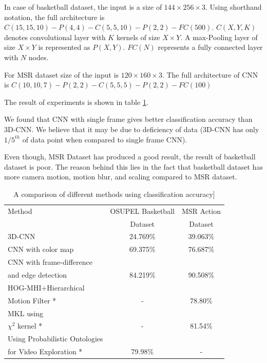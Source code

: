 In case of basketball dataset, the input is a size of $144 \times 256 \times 3$. Using shorthand notation, the full architecture is $C(15, 15, 10)-P(4, 4)-C(5, 5, 10)-P(2, 2)-FC(500)$. $C(X, Y, K)$ denotes convolutional layer with $K$ kernels of size $X \times Y$. A max-Pooling layer of size $X \times Y$ is represented as $P(X,Y)$. $FC(N)$ represents a fully connected layer with $N$ nodes. 

For MSR dataset size of the input is $120 \times 160 \times 3$. The full architecture of CNN is $C(10, 10, 7)-P(2, 2)-C(5, 5, 5)-P(2, 2)-FC(100)$

The result of experiments is shown in table \ref{table:cnn_res}.

We found that CNN with single frame gives better classification accuracy than 3D-CNN. We believe that it may be due to deficiency of data (3D-CNN has only $1/5^{th}$ of data point when compared to single frame CNN).

Even though, MSR Dataset has produced a good result, the result of basketball dataset is poor. The reason behind this lies in the fact that basketball dataset has more camera motion, motion blur, and scaling compared to MSR dataset.


\begin{table}[h]
\caption[A comparison of different methods using classification accuracy]{A comparison of different methods using classification accuracy]}
\label{table:cnn_res}
\centering
\begin{tabular}{|l|c|c|}
\hline
Method & OSUPEL Basketball& MSR Action\\
       & Dataset          &Dataset \\
\hline
\hline
3D-CNN  &24.769\%   &39.063\% \\
\hline
CNN with color map  &69.375\%   &76.687\% \\
\hline
CNN with frame-difference &&\\
and edge detection &84.219\%   &90.508\% \\
\hline
HOG-MHI+Hierarchical &&\\
Motion Filter * \citep{tian2012hierarchical} & -  &78.80\% \\
\hline
MKL using&&\\
$\chi^2$ kernel * \citep{zhao2014feature} & -  &81.54\% \\
\hline
 Using Probabilistic Ontologies&&\\
 for Video Exploration * \citep{bustamante2012using} & 79.98\%   & - \\
\hline  
\end{tabular}
\end{table} 


